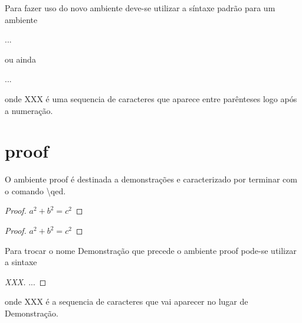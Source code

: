 Para fazer uso do novo ambiente deve-se utilizar a síntaxe padrão para um ambiente
\begin{latexcode}
    \begin{nome}
        ...
    \end{nome}
\end{latexcode}
ou ainda
\begin{latexcode}
    \begin{nome}[XXX]
        ...
    \end{nome}
\end{latexcode}
onde \textsf{XXX} é uma sequencia de caracteres que aparece entre parênteses logo após a numeração.

\section{\textsf{proof}}

O ambiente \textsf{proof} é destinada a demonstrações e caracterizado por terminar com o comando \textbackslash\textsf{qed}. \\
\begin{minipage}[t]{0.47\linewidth} \vspace{-8pt}
    \begin{latexcode}
        \begin{proof}
            $a^2 + b^2 = c^2$
        \end{proof}
    \end{latexcode}
\end{minipage} \hfill
\begin{minipage}[t]{0.47\linewidth} \vspace{0pt}
    \begin{proof}
        $a^2 + b^2 = c^2$
    \end{proof}
\end{minipage}

Para trocar o nome \textsf{Demonstração} que precede o ambiente \textsf{proof} pode-se utilizar a sintaxe
\begin{latexcode}
    \begin{proof}[XXX]
        ...
    \end{proof}
\end{latexcode}
onde \textsf{XXX} é a sequencia de caracteres que vai aparecer no lugar de \textsf{Demonstração}.

